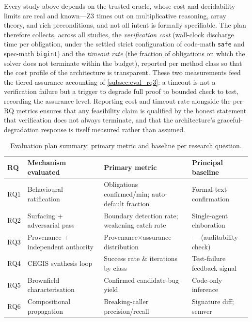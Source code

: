 Every study above depends on the trusted oracle, whose cost and decidability limits are real and known---Z3 times out on multiplicative reasoning, array theory, and rich preconditions, and not all intent is formally specifiable. The plan therefore collects, across all studies, the \emph{verification cost} (wall-clock discharge time per obligation, under the settled strict configuration of code-math \texttt{safe} and spec-math \texttt{bigint}) and the \emph{timeout rate} (the fraction of obligations on which the solver does not terminate within the budget), reported per method class so that the cost profile of the architecture is transparent. These two measurements feed the tiered-assurance accounting of \cref{subsec:eval_rq3}: a timeout is not a verification failure but a trigger to degrade full proof to bounded check to test, recording the assurance level. Reporting cost and timeout rate alongside the per-RQ metrics ensures that any feasibility claim is qualified by the honest statement that verification does not always terminate, and that the architecture's graceful-degradation response is itself measured rather than assumed.

\begin{table}[t]
\centering
\caption{Evaluation plan summary: primary metric and baseline per research question.}
\label{tab:eval_summary}
\small
\begin{tabular}{@{}llll@{}}
\toprule
RQ & Mechanism evaluated & Primary metric & Principal baseline \\
\midrule
RQ1 & Behavioural ratification        & Obligations confirmed/min; auto-default fraction & Formal-text confirmation \\
RQ2 & Surfacing + adversarial pass    & Boundary detection rate; weakening catch rate    & Single-agent elaboration \\
RQ3 & Provenance + independent authority & Provenance$\times$assurance distribution        & --- (auditability check) \\
RQ4 & CEGIS synthesis loop            & Success rate \& iterations by class              & Test-failure feedback signal \\
RQ5 & Brownfield characterisation     & Confirmed candidate-bug yield                    & Code-only inference \\
RQ6 & Compositional propagation       & Breaking-caller precision/recall                 & Signature diff; semver \\
\bottomrule
\end{tabular}
\end{table}


